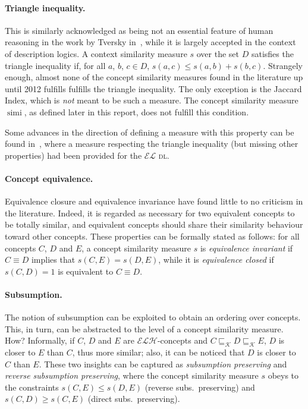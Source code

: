 \documentclass[]{llncs}
\DeclareMathOperator{\simi}{simi}
\newcommand{\el}{\(\mathcal{EL}{}\)}
\newcommand{\elh}{\(\mathcal{ELH}{}\)}
\newcommand{\dl}{\textsc{dl}}
\newcommand{\subsume}[1]{\sqsubseteq_{\mathcal{#1}}}
\begin{document}
  \paragraph{Triangle inequality.} This is similarly acknowledged as being not an essential feature of human reasoning in the work by Tversky in~\cite{Tve77}, while it is largely accepted in the context of description logics.
  A context similarity measure \(s\) over the set \(D\) satisfies the triangle inequality if, for all \(a\), \(b\), \(c \in D\),
  \(s(a,c) \le s(a,b) + s(b,c)\).
  Strangely enough, almost none of the concept similarity measures found in the literature up until 2012 fulfills fulfills the triangle inequality.
  The only exception is the Jaccard Index, which is \emph{not} meant to be such a measure.
  The concept similarity measure \(\simi\), as defined later in this report, does not fulfill this condition.

  Some advances in the direction of defining a measure with this property can be found in~\cite{DAB14}, where a measure respecting the triangle inequality (but missing other properties) had been provided for the \el{} \dl.

  \paragraph{Concept equivalence.} Equivalence closure and equivalence invariance have found little to no criticism in the literature.
  Indeed, it is regarded as necessary for two equivalent concepts to be totally similar, and equivalent concepts should share their similarity behaviour toward other concepts.
  These properties can be formally stated as follows: for all concepts \(C\), \(D\) and \(E\), a concept similarity measure \(s\) is \emph{equivalence invariant} if \(C \equiv D\) implies that \(s(C,E) = s(D,E)\), while it is \emph{equivalence closed} if \(s(C,D) = 1\) is equivalent to \(C \equiv D\).

  \paragraph{Subsumption.} The notion of subsumption can be exploited to obtain an ordering over concepts.
  This, in turn, can be abstracted to the level of a concept similarity measure. How?
  Informally, if \(C\), \(D\) and \(E\) are \elh-concepts and \(C \subsume{K} D \subsume{K} E\), \(D\) is closer to \(E\) than \(C\), thus more similar;
  also, it can be noticed that \(D\) is closer to \(C\) than \(E\).
  These two insights can be captured as \emph{subsumption preserving} and \emph{reverse subsumption preserving}, where the concept similarity measure \(s\) obeys to the constraints \(s(C,E) \le s(D,E)\) (reverse subs.\ preserving) and \(s(C,D) \ge s(C,E)\) (direct subs.\ preserving).
\end{document}
